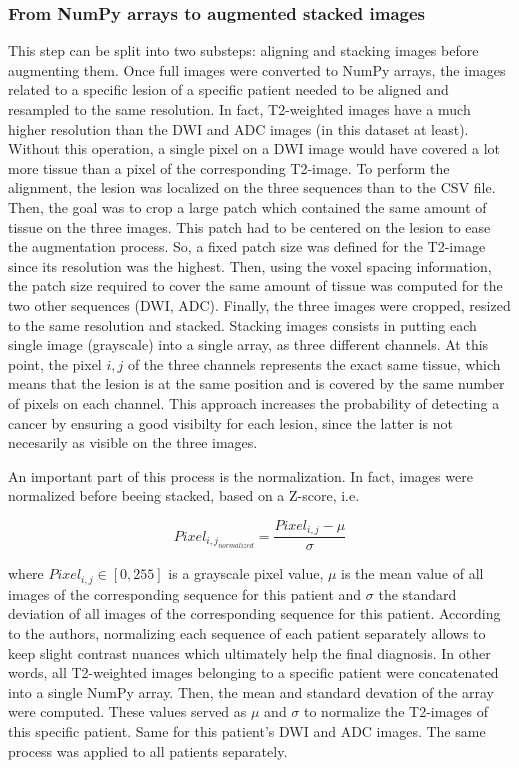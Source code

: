 \subsubsection{From NumPy arrays to augmented stacked images}
\label{sec:numpyToAugmentedStacked}
This step can be split into two substeps: aligning and stacking images before augmenting them. Once full images were converted to NumPy arrays, the images related to a specific lesion of a specific patient needed to be aligned and resampled to the same resolution. In fact, T2-weighted images have a much higher resolution than the DWI and ADC images (in this dataset at least). Without this operation, a single pixel on a DWI image would have covered a lot more tissue than a pixel of the corresponding T2-image. To perform the alignment, the lesion was localized on the three sequences than to the CSV file. Then, the goal was to crop a large patch which contained the same amount of tissue on the three images. This patch had to be centered on the lesion to ease the augmentation process. So, a fixed patch size was defined for the T2-image since its resolution was the highest. Then, using the voxel spacing information, the patch size required to cover the same amount of tissue was computed for the two other sequences (DWI, ADC). Finally, the three images were cropped, resized to the same resolution and stacked. Stacking images consists in putting each single image (grayscale) into a single array, as three different channels. At this point, the pixel $i,j$ of the three channels represents the exact same tissue, which means that the lesion is at the same position and is covered by the same number of pixels on each channel. This approach increases the probability of detecting a cancer by ensuring a good visibilty for each lesion, since the latter is not necesarily as visible on the three images.

An important part of this process is the normalization. In fact, images were normalized before beeing stacked, based on a Z-score, i.e. 

\begin{equation}
\label{eq:normalization}
	Pixel_{{i,j}_{normalized}} = \frac{Pixel_{i,j} - \mu}{\sigma}
\end{equation}

\noindent where $Pixel_{i,j} \in [0,255]$ is a grayscale pixel value, $\mu$ is the mean value of all images of the corresponding sequence for this patient and $\sigma$ the standard deviation of all images of the corresponding sequence for this patient. According to the authors, normalizing each sequence of each patient separately allows to keep slight contrast nuances which ultimately help the final diagnosis. In other words, all T2-weighted images belonging to a specific patient were concatenated into a single NumPy array. Then, the mean and standard devation of the array were computed. These values served as $\mu$ and $\sigma$ to normalize the T2-images of this specific patient. Same for this patient's DWI and ADC images. The same process was applied to all patients separately. 

